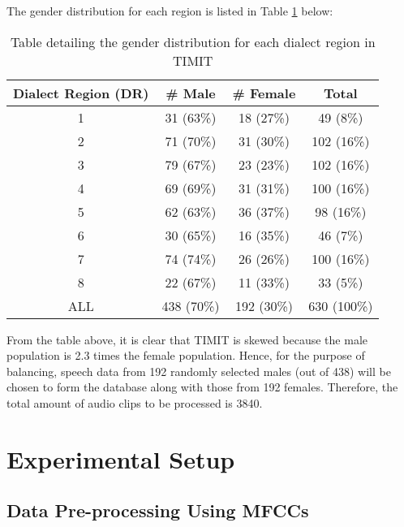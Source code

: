 \documentclass[11pt]{article}  %
\begin{document}
The gender distribution for each region is listed in Table \ref{table1} below:

\begin{table}[htbp]
	\begin{center}
		\begin{tabular}{|c|c|c|c|}
			\hline
			\textbf{Dialect Region (DR)}&\textbf{\# Male}&\textbf{\# Female}&\textbf{Total} \\
			\hline
			1 & 31 (63\%) & 18 (27\%) & 49 (8\%) \\
			\hline
			2 & 71 (70\%) & 31 (30\%) & 102 (16\%) \\
			\hline
			3 & 79 (67\%) & 23 (23\%) & 102 (16\%) \\
			\hline
			4 & 69 (69\%) & 31 (31\%) & 100 (16\%) \\
			\hline
			5 & 62 (63\%) & 36 (37\%) & 98 (16\%) \\
			\hline
			6 & 30 (65\%) & 16 (35\%) & 46 (7\%) \\
			\hline
			7 & 74 (74\%) & 26 (26\%) & 100 (16\%) \\
			\hline
			8 & 22 (67\%) & 11 (33\%) & 33 (5\%) \\
			\hline
			\rowcolor{LightCyan}
			ALL & 438 (70\%) & 192 (30\%) & 630 (100\%) \\
			\hline
		\end{tabular}
		\caption{Table detailing the gender distribution for each dialect region in TIMIT}
		\label{table1}
	\end{center}
\end{table}

From the table above, it is clear that TIMIT is skewed because the male population is 2.3 times the female population. Hence, for the purpose of balancing, speech data from 192 randomly selected males (out of 438) will be chosen to form the database along with those from 192 females. Therefore, the total amount of audio clips to be processed is 3840.

\section{Experimental Setup}
\label{experimental_setup}

\subsection{Data Pre-processing Using MFCCs}

\end{document}
